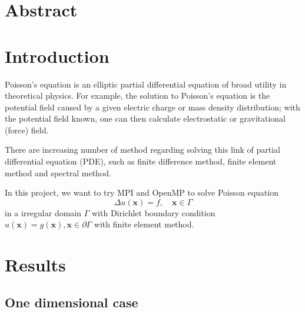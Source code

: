 \documentclass[11pt]{article}
\begin{document}
\section{Abstract}

\section{Introduction}
Poisson's equation is an elliptic partial differential equation of broad utility in theoretical physics. For example, the solution to Poisson's equation is the potential field caused by a given electric charge or mass density distribution; with the potential field known, one can then calculate electrostatic or gravitational (force) field. 

There are increasing number of method regarding solving this link of partial differential equation (PDE), such as finite difference method, finite element method and spectral method. 

In this project, we want to try MPI and OpenMP to solve Poisson equation
\begin{equation}
	\Delta u(\mathbf{x}) = f, \quad \mathbf{x} \in \Gamma
\end{equation}
in a irregular domain $\Gamma$ with Dirichlet boundary condition $u(\mathbf{x}) = g(\mathbf{x}), \mathbf{x}\in \partial\Gamma $ with finite element method.
  
\section{Results}
\subsection{One dimensional case}
\end{document}

